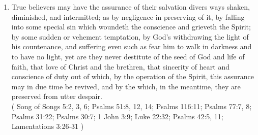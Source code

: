 \documentclass[12pt,a4paper]{book}
\begin{document}
\begin{enumerate}
\item
\label{ch-ass-gra-sal-4}
True believers may have the assurance of their salvation divers ways shaken, diminished, and intermitted; as by negligence in preserving of it, by falling into some special sin which woundeth the conscience and grieveth the Spirit; by some sudden or vehement temptation, by God's withdrawing the light of his countenance, and suffering even such as fear him to walk in darkness and to have no light, yet are they never destitute of the seed of God and life of faith, that love of Christ and the brethren, that sincerity of heart and conscience of duty out of which, by the operation of the Spirit, this assurance may in due time be revived, and by the which, in the meantime, they are preserved from utter despair.\\
( Song of Songs 5:2, 3, 6; Psalms 51:8, 12, 14; Psalms 116:11; Psalms 77:7, 8; Psalms 31:22; Psalms 30:7; 1 John 3:9; Luke 22:32; Psalms 42:5, 11; Lamentations 3:26-31 )
\end{enumerate}
\end{document}
